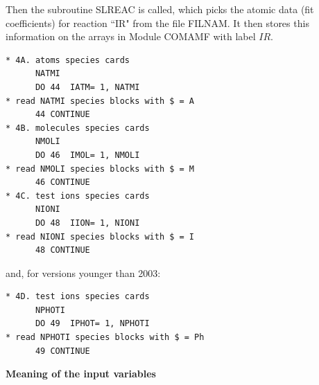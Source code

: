 \medskip

Then the subroutine SLREAC is called, which picks the atomic data (fit
coefficients) for reaction ``IR" from the file FILNAM.
It then stores this information on the arrays in Module COMAMF with label $IR$.

\begin{lstlisting}
* 4A. atoms species cards
      NATMI
      DO 44  IATM= 1, NATMI
* read NATMI species blocks with $ = A
      44 CONTINUE
* 4B. molecules species cards
      NMOLI
      DO 46  IMOL= 1, NMOLI
* read NMOLI species blocks with $ = M
      46 CONTINUE
* 4C. test ions species cards
      NIONI
      DO 48  IION= 1, NIONI
* read NIONI species blocks with $ = I
      48 CONTINUE
\end{lstlisting}

and, for versions younger than 2003:

\begin{lstlisting}
* 4D. test ions species cards
      NPHOTI
      DO 49  IPHOT= 1, NPHOTI
* read NPHOTI species blocks with $ = Ph
      49 CONTINUE
\end{lstlisting}

\medskip

\textbf{Meaning of the input variables} 

\medskip 

